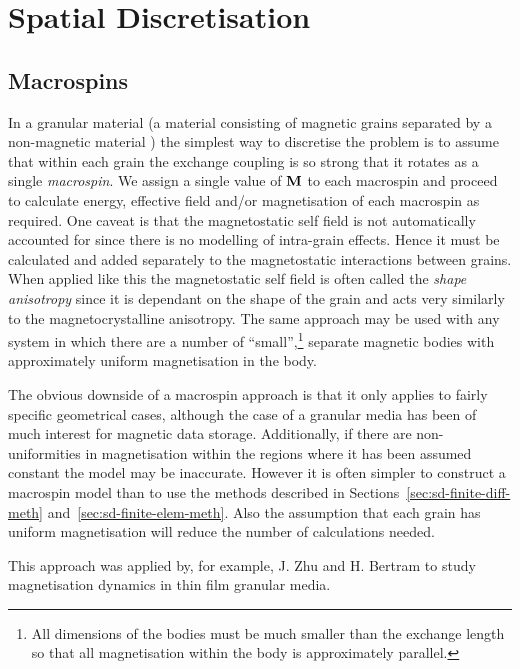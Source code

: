 \section{Spatial Discretisation}
\label{sec:spat-discr}

\subsection{Macrospins}
\label{sec:sd-macrospins}

In a granular material (a material consisting of magnetic grains separated by a non-magnetic material%
) the simplest way to discretise the problem is to assume that within each grain the exchange coupling is so strong that it rotates as a single \emph{macrospin}. We assign a single value of $\mathbf{M}$ to each macrospin and proceed to calculate energy, effective field and/or magnetisation of each macrospin as required. One caveat is that the magnetostatic self field is not automatically accounted for since there is no modelling of intra-grain effects. Hence it must be calculated and added separately to the magnetostatic interactions between grains. When applied like this the magnetostatic self field is often called the \emph{shape anisotropy} since it is dependant on the shape of the grain and acts very similarly to the magnetocrystalline anisotropy. The same approach may be used with any system in which there are a number of ``small'',\footnote{All dimensions of the bodies must be much smaller than the exchange length so that all magnetisation within the body is approximately parallel.} separate magnetic bodies with approximately uniform magnetisation in the body.

The obvious downside of a macrospin approach is that it only applies to fairly specific geometrical cases, although the case of a granular media has been of much interest for magnetic data storage. Additionally, if there are non-uniformities in magnetisation within the regions where it has been assumed constant the model may be inaccurate. However it is often simpler to construct a macrospin model than to use the methods described in Sections~\ref{sec:sd-finite-diff-meth} and~\ref{sec:sd-finite-elem-meth}. Also the assumption that each grain has uniform magnetisation will reduce the number of calculations needed.

This approach was applied by, for example, J. Zhu and H. Bertram to study magnetisation dynamics in thin film granular media.\cite{Zhu1988}

